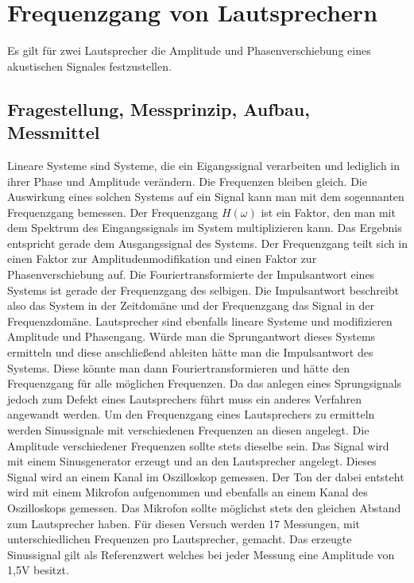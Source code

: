 %
%
\chapter{Frequenzgang von Lautsprechern}
Es gilt für zwei Lautsprecher die Amplitude und Phasenverschiebung eines akustischen Signales festzustellen.

\label{chap:FrequenzgangVonLautsprechern}

\section{Fragestellung, Messprinzip, Aufbau, Messmittel}
Lineare Systeme sind Systeme, die ein Eigangssignal verarbeiten und lediglich in ihrer Phase und Amplitude verändern. Die Frequenzen bleiben gleich. Die Auswirkung eines solchen Systems auf ein Signal kann man mit dem sogennanten Frequenzgang bemessen. Der Frequenzgang $H(\omega)$ ist ein Faktor, den man mit dem Spektrum des Eingangssignals im System multiplizieren kann. Das Ergebnis entspricht gerade dem Ausgangssignal des Systems. Der Frequenzgang teilt sich in einen Faktor zur Amplitudenmodifikation und einen Faktor zur Phasenverschiebung auf.
Die Fouriertransformierte der Impulsantwort eines Systems ist gerade der Frequenzgang des selbigen. Die Impulsantwort beschreibt also das System in der Zeitdomäne und der Frequenzgang das Signal in der Frequenzdomäne.
Lautsprecher sind ebenfalls lineare Systeme und modifizieren Amplitude und Phasengang. Würde man die Sprungantwort dieses Systems ermitteln und diese anschließend ableiten hätte man die Impulsantwort des Systems. Diese könnte man dann Fouriertransformieren und hätte den Frequenzgang für alle möglichen Frequenzen. Da das anlegen eines Sprungsignals jedoch zum Defekt eines Lautsprechers führt muss ein anderes Verfahren angewandt werden. 
Um den Frequenzgang eines Lautsprechers zu ermitteln werden Sinussignale mit verschiedenen Frequenzen an diesen angelegt. Die Amplitude verschiedener Frequenzen sollte stets dieselbe sein. Das Signal wird mit einem Sinusgenerator erzeugt und an den Lautsprecher angelegt. Dieses Signal wird an einem Kanal im Oszilloskop gemessen. Der Ton der dabei entsteht wird mit einem Mikrofon aufgenommen und ebenfalls an einem Kanal des Oszilloskops gemessen. Das Mikrofon sollte möglichst stets den gleichen Abstand zum Lautsprecher haben.
Für diesen Versuch werden 17 Messungen, mit unterschiedlichen Frequenzen pro Lautsprecher, gemacht.
Das erzeugte Sinussignal gilt als Referenzwert welches bei jeder Messung eine Amplitude von 1,5V besitzt.
